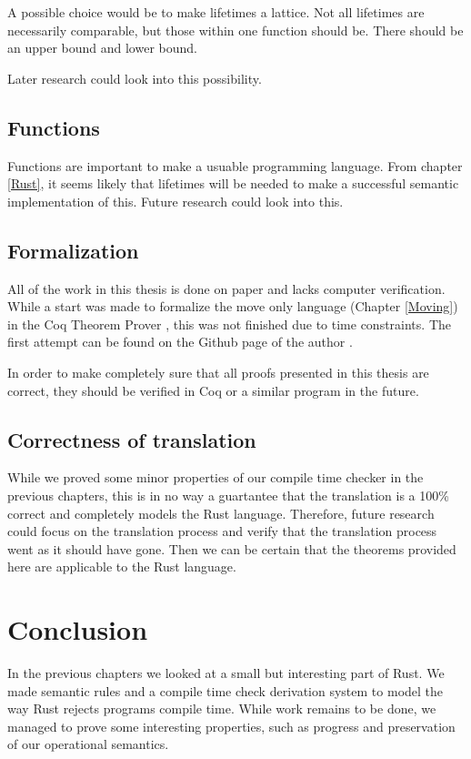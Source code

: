 A possible choice would be to make lifetimes a lattice. Not all lifetimes are necessarily comparable, but those within one function should be. There should be an upper bound and lower bound. 

Later research could look into this possibility. 

\subsection{Functions}
Functions are important to make a usuable programming language. From chapter \ref{Rust}, it seems likely that lifetimes will be needed to make a successful semantic implementation of this. Future research could look into this. 

\subsection{Formalization}
All of the work in this thesis is done on paper and lacks computer verification. While a start was made to formalize the move only language (Chapter \ref{Moving}) in the Coq Theorem Prover \citep{barras1997coq}, this was not finished due to time constraints. The first attempt can be found on the Github page of the author \citep{github}. 

In order to make completely sure that all proofs presented in this thesis are correct, they should be verified in Coq or a similar program in the future. 

\subsection{Correctness of translation}
While we proved some minor properties of our compile time checker in the previous chapters, this is in no way a guartantee that the translation is a 100\% correct and completely models the Rust language. Therefore, future research could focus on the translation process and verify that the translation process went as it should have gone. Then we can be certain that the theorems provided here are applicable to the Rust language. 

\section{Conclusion}
In the previous chapters we looked at a small but interesting part of Rust. We made semantic rules and a compile time check derivation system to model the way Rust rejects programs compile time. While work remains to be done, we managed to prove some interesting properties, such as progress and preservation of our operational semantics.

